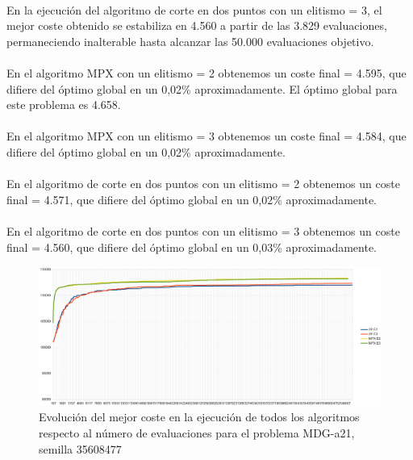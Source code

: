 	\paragraph{}En la ejecución del algoritmo de corte en dos puntos con un elitismo = 3, el mejor coste obtenido se estabiliza en 4.560 a partir de las 3.829 evaluaciones, permaneciendo inalterable hasta alcanzar las 50.000 evaluaciones objetivo.
	
	\paragraph{}En el algoritmo MPX con un elitismo = 2 obtenemos un coste final = 4.595, que difiere del óptimo global en un 0,02\% aproximadamente. El óptimo global para este problema es 4.658.
	
	\paragraph{}En el algoritmo MPX con un elitismo = 3 obtenemos un coste final = 4.584, que difiere del óptimo global en un 0,02\% aproximadamente.
	
	\paragraph{}En el algoritmo de corte en dos puntos con un elitismo = 2 obtenemos un coste final = 4.571, que difiere del óptimo global en un 0,02\% aproximadamente.
	
	\paragraph{}En el algoritmo de corte en dos puntos con un elitismo = 3 obtenemos un coste final = 4.560, que difiere del óptimo global en un 0,03\% aproximadamente.

	\begin{figure}[H]
		\centering
		\includegraphics[scale=0.3]{img/35608477_MDG-a_21_n2000_m200.png}
		\caption{Evolución del mejor coste en la ejecución de todos los algoritmos respecto al número de evaluaciones para el problema MDG-a21, semilla 35608477}
		\label{MDG-a_21_historico}
	\end{figure}

